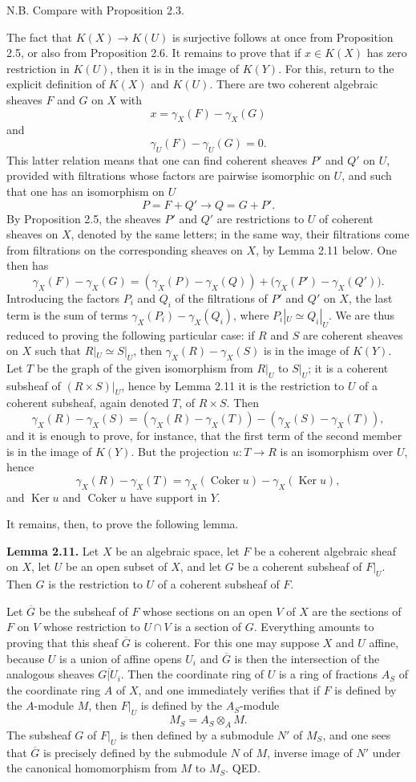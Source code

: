 \documentclass[11pt]{article}
\providecommand{\Coker}{\operatorname{Coker}}
\providecommand{\Ker}{\operatorname{Ker}}
\begin{document}
N.B. Compare with Proposition 2.3.

The fact that $K(X)\to K(U)$ is surjective follows at once from Proposition 2.5, or also from Proposition 2.6. It remains to prove that if $x\in K(X)$ has zero restriction in $K(U)$, then it is in the image of $K(Y)$. For this, return to the explicit definition of $K(X)$ and $K(U)$. There are two coherent algebraic sheaves $F$ and $G$ on $X$ with
\[
 x=\gamma_X(F)-\gamma_X(G)
\]
and
\[
 \gamma_U(F)-\gamma_U(G)=0.
\]
This latter relation means that one can find coherent sheaves $P'$ and $Q'$ on $U$, provided with filtrations whose factors are pairwise isomorphic on $U$, and such that one has an isomorphism on $U$
\[
 P=F+Q'\longrightarrow Q=G+P'.
\]
By Proposition 2.5, the sheaves $P'$ and $Q'$ are restrictions to $U$ of coherent sheaves on $X$, denoted by the same letters; in the same way, their filtrations come from filtrations on the corresponding sheaves on $X$, by Lemma 2.11 below. One then has
\[
 \gamma_X(F)-\gamma_X(G)=(\gamma_X(P)-\gamma_X(Q))+\bigl(\gamma_X(P')-\gamma_X(Q')\bigr).
\]
Introducing the factors $P_i$ and $Q_i$ of the filtrations of $P'$ and $Q'$ on $X$, the last term is the sum of terms $\gamma_X(P_i)-\gamma_X(Q_i)$, where $P_i|_U\simeq Q_i|_U$. We are thus reduced to proving the following particular case: if $R$ and $S$ are coherent sheaves on $X$ such that $R|_U\simeq S|_U$, then $\gamma_X(R)-\gamma_X(S)$ is in the image of $K(Y)$. Let $T$ be the graph of the given isomorphism from $R|_U$ to $S|_U$; it is a coherent subsheaf of $(R\times S)|_U$, hence by Lemma 2.11 it is the restriction to $U$ of a coherent subsheaf, again denoted $T$, of $R\times S$. Then
\[
 \gamma_X(R)-\gamma_X(S)=(\gamma_X(R)-\gamma_X(T))-(\gamma_X(S)-\gamma_X(T)),
\]
and it is enough to prove, for instance, that the first term of the second member is in the image of $K(Y)$. But the projection $u:T\to R$ is an isomorphism over $U$, hence
\[
 \gamma_X(R)-\gamma_X(T)=\gamma_X(\Coker u)-\gamma_X(\Ker u),
\]
and $\Ker u$ and $\Coker u$ have support in $Y$.

It remains, then, to prove the following lemma.

\textbf{Lemma 2.11.} Let $X$ be an algebraic space, let $F$ be a coherent algebraic sheaf on $X$, let $U$ be an open subset of $X$, and let $G$ be a coherent subsheaf of $F|_U$. Then $G$ is the restriction to $U$ of a coherent subsheaf of $F$.

Let $\overline G$ be the subsheaf of $F$ whose sections on an open $V$ of $X$ are the sections of $F$ on $V$ whose restriction to $U\cap V$ is a section of $G$. Everything amounts to proving that this sheaf $\overline G$ is coherent. For this one may suppose $X$ and $U$ affine, because $U$ is a union of affine opens $U_i$ and $\overline G$ is then the intersection of the analogous sheaves $\overline{G|U_i}$. Then the coordinate ring of $U$ is a ring of fractions $A_S$ of the coordinate ring $A$ of $X$, and one immediately verifies that if $F$ is defined by the $A$-module $M$, then $F|_U$ is defined by the $A_S$-module
\[
 M_S=A_S\otimes_A M.
\]
The subsheaf $G$ of $F|_U$ is then defined by a submodule $N'$ of $M_S$, and one sees that $\overline G$ is precisely defined by the submodule $N$ of $M$, inverse image of $N'$ under the canonical homomorphism from $M$ to $M_S$. QED.
\end{document}
